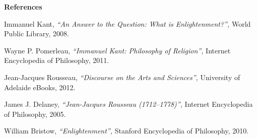 \begin{multicols}{2}
\noindent\textbf{\large References}

\begin{enumerate}[{[1]}]
\item Immanuel Kant, \emph{“An Answer to the Question: What is Enlightenment?”,} World Public Library, 2008.
\item Wayne P. Pomerleau, \emph{“Immanuel Kant: Philosophy of Religion”,} Internet Encyclopedia of Philosophy, 2011.
\item Jean-Jacques Rousseau, \emph{``Discourse on the Arts and Sciences'',} University of Adelaide eBooks, 2012.
\item James J. Delaney, \emph{``Jean-Jacques Rousseau (1712--1778)'',} Internet Encyclopedia of Philosophy, 2005.
\item William Bristow, \emph{“Enlightenment”,} Stanford Encyclopedia of Philosophy, 2010.
\end{enumerate}
\end{multicols}
